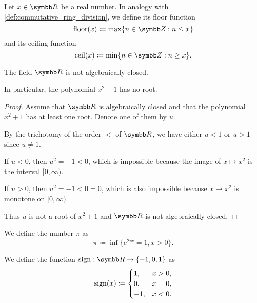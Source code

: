\begin{definition}\label{def:floor_ceiling_functions}
  Let \( x \in \BR \) be a real number. In analogy with \cref{def:commutative_ring_division}, we define its floor function
  \begin{equation*}
    \Floor(x) \coloneqq \max \{ n \in \BZ : n \leq x \}
  \end{equation*}
  and its ceiling function
  \begin{equation*}
    \Ceil(x) \coloneqq \min \{ n \in \BZ : n \geq x \}.
  \end{equation*}
\end{definition}

\begin{proposition}\label{thm:reals_not_algebraically_closed}
  The field \( \BR \) is not algebraically closed.

  In particular, the polynomial \( x^2 + 1 \) has no root.
\end{proposition}
\begin{proof}
  Assume that \( \BR \) is algebraically closed and that the polynomial \( x^2 + 1 \) has at least one root. Denote one of them by \( u \).

  By the trichotomy of the order \( < \) of \( \BR \), we have either \( u < 1 \) or \( u > 1 \) since \( u \neq 1 \).

  If \( u < 0 \), then \( u^2 = -1 < 0 \), which is impossible because the image of \( x \mapsto x^2 \) is the interval \( [0, \infty) \).

  If \( u > 0 \), then \( u^2 = -1 < 0 = 0 \), which is also impossible because \( x \mapsto x^2 \) is monotone on \( [0, \infty) \).

  Thus \( u \) is not a root of \( x^2 + 1 \) and \( \BR \) is not algebraically closed.
\end{proof}

\begin{definition}\label{def:pi}\cite[515]{Knapp2016BAlg}
  We define the number \( \pi \) as
  \begin{equation*}
    \pi \coloneqq \inf\{ e^{2ix} = 1, x > 0 \}.
  \end{equation*}
\end{definition}

\begin{definition}\label{def:signum}
  We define the  function \( \Sign: \BR \to \{ -1, 0, 1 \} \) as
  \begin{equation*}
    \operatorname{sign}(x) \coloneqq \begin{cases}
      1,  &x > 0, \\
      0,  &x = 0, \\
      -1, &x < 0.
    \end{cases}
  \end{equation*}
\end{definition}
